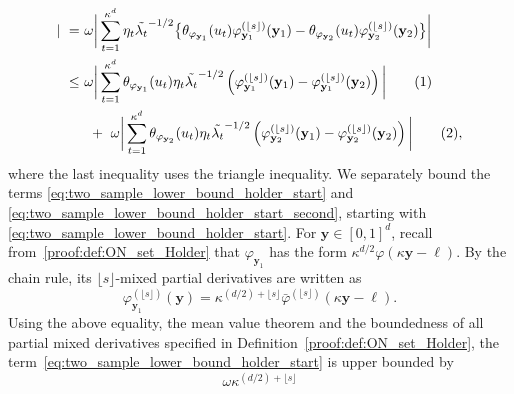 \documentclass[twoside,11pt]{article}
\newcommand\numberthis{\addtocounter{equation}{1}\tag{\theequation}}
\newcommand{\floor}[1]{\lfloor #1 \rfloor} %
\newcommand{\vectorize}[1]{\mathbf{#1}}
\newcommand{\dimDensity}{d} %
\newcommand{\binNum}{\kappa}           %
\newcommand{\coef}{\theta}
\newcommand{\wavMotherUnivIndex}{\ell}
\newcommand{\wavMotherIndex}{\boldsymbol{\wavMotherUnivIndex}}
\newcommand{\domainTs}{
	[0,1]^{{\dimDensity}}
}
\begin{document}
\begin{appendix}
\begin{itemize}
\begin{align*}
		|
		~=~& %
		\omega
		\bigg|
		\sum_{t=1}^{\binNum^{\dimDensity}}
		\eta_t
		\tilde{\lambda_t}^{-1/2}
		\bigl\{
		\coef_{\varphi_{\vectorize{y}_1}}(u_t)
		\varphi_{\vectorize{y}_1}^{(\floor{s})}(\vectorize{y}_1)
		-
		\coef_{\varphi_{\vectorize{y}_2}}(u_t)
		\varphi_{\vectorize{y}_2}^{(\floor{s})}(\vectorize{y}_2)
		\bigr\}
		\bigg|
		\\
		~\leq~& %
		\omega
		\bigg|
		\sum_{t=1}^{\binNum^{\dimDensity}}
		\coef_{\varphi_{\vectorize{y}_1}}(u_t)
		\eta_t
		\tilde{\lambda_t}^{-1/2}
		\left(
		\varphi^{(\floor{s})}_{\vectorize{y}_1}(\vectorize{y}_1)
		-
		\varphi^{(\floor{s})}_{\vectorize{y}_1}(\vectorize{y}_2)
		\right)
		\bigg|
		\numberthis \label{eq:two_sample_lower_bound_holder_start}
		\\
		&~+~
		\omega
		\bigg|
		\sum_{t=1}^{\binNum^{\dimDensity}}
		\coef_{\varphi_{\vectorize{y}_2}}(u_t)
		\eta_t
		\tilde{\lambda_t}^{-1/2}
		\left(
		\varphi^{(\floor{s})}_{\vectorize{y}_2}(\vectorize{y}_1)
		-
		\varphi^{(\floor{s})}_{\vectorize{y}_2}(\vectorize{y}_2)
		\right)
		\bigg|
		\numberthis \label{eq:two_sample_lower_bound_holder_start_second},
	\end{align*}
	where the last inequality uses the triangle inequality.
	We separately bound the terms \eqref{eq:two_sample_lower_bound_holder_start} and \eqref{eq:two_sample_lower_bound_holder_start_second}, starting with
	\eqref{eq:two_sample_lower_bound_holder_start}.
	For $\vectorize{y} \in \domainTs$,
	recall from~\eqref{proof:def:ON_set_Holder} that  $\varphi_{\vectorize{y}_1}$ has the form
	$
	\binNum^{\dimDensity/2}
	\varphi(
	\binNum \vectorize{y} - \wavMotherIndex
	)$. 
	By the chain rule, its $\floor{s}$-mixed partial derivatives are written as
	\begin{equation}\label{holder_chainrule}
		\varphi_{\vectorize{y}_1}^{(\floor{s})}(\vectorize{y})
		=
		\kappa^{(\dimDensity/2) + \floor{s}}
		\bar{\varphi}
		^{(\floor{s})}
		(
		\binNum
		\vectorize{y} - \wavMotherIndex
		).
	\end{equation}
	Using the above equality, the mean value theorem and the boundedness of all partial mixed derivatives specified in Definition~\ref{proof:def:ON_set_Holder}, the term~\eqref{eq:two_sample_lower_bound_holder_start} is upper bounded by
	\begin{equation*}\label{eq:two_sample_lower_bound_holder_MVT}
		\omega
		\kappa^{(\dimDensity/2) + \floor{s}}

\end{equation*}
\end{itemize}
\end{appendix}
\end{document}
